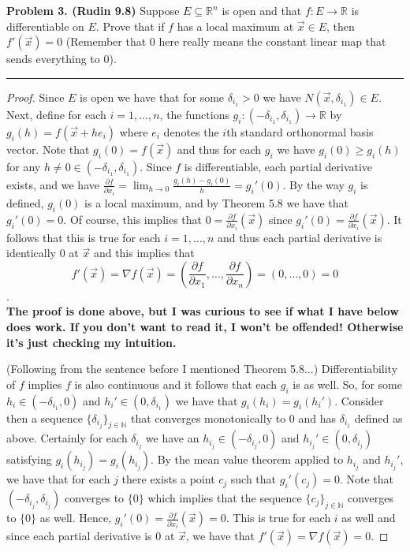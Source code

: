 \documentclass[leqno]{article}
\theoremstyle{nonumberplain}
\newtheorem{proof}{Proof}
\newcommand{\R}{\mathbb{R}}
\newcommand{\N}{\mathbb{N}}
\begin{document}


\noindent\textbf{Problem 3. (Rudin 9.8)} Suppose $E\subseteq \R^n$ is open and that $f\colon E\to \R$ is differentiable on $E$. Prove that if $f$ has a local maximum at $\vec{x}\in E$, then $f'(\vec{x})=0$ (Remember that $0$ here really means the constant linear map that sends everything to $0$).

\noindent\rule[0.5ex]{\linewidth}{1pt}

\begin{proof} 
Since $E$ is open we have that for some $\delta_{i_1}>0$ we have $N(\vec{x},\delta_{i_1})\in E$. Next, define for each $i=1,\dots, n$, the functions $g_i\colon (-\delta_{i_1},\delta_{i_1}) \to \R$ by $g_i(h)=f(\vec{x}+he_i)$ where $e_i$ denotes the $i$th standard orthonormal basis vector.  Note that $g_i(0)=f(\vec{x})$ and thus for each $g_i$ we have $g_i(0)\geq g_i(h)$ for any $h\neq 0 \in (-\delta_{i_1},\delta_{i_1})$.  Since $f$ is differentiable, each partial derivative exists, and we have $\frac{\partial f}{\partial x_i}=\lim_{h\to 0} \frac{g_i(h)-g_i(0)}{h}=g_i'(0)$. By the way $g_i$ is defined, $g_i(0)$ is a local maximum, and by Theorem 5.8 we have that $g_i'(0)=0$.  Of course, this implies that $0=\frac{\partial f}{\partial x_i}(\vec{x})$ since $g_i'(0)=\frac{\partial f}{\partial x_i}(\vec{x})$.  It follows that this is true for each $i=1,\dots, n$ and thus each partial derivative is identically 0 at $\vec{x}$ and this implies that \[f'(\vec{x})=\nabla f(\vec{x})=\left(\frac{\partial f}{\partial x_1},\dots,\frac{\partial f}{\partial x_n}\right)=(0,\dots,0)=0\].  \\

\noindent \textbf{The proof is done above, but I was curious to see if what I have below does work.  If you don't want to read it, I won't be offended! Otherwise it's just checking my intuition.}

(Following from the sentence before I mentioned Theorem 5.8...) Differentiability of $f$ implies $f$ is also continuous and it follows that each $g_i$ is as well. So, for some $h_{i} \in (-\delta_{i_1},0)$ and $h_{i}' \in (0,\delta_{i_1})$ we have that $g_i(h_{i})=g_i(h_{i}')$. Consider then a sequence $\{\delta_{i_j}\}_{j\in \N}$ that converges monotonically to $0$ and has $\delta_{i_1}$ defined as above.  Certainly for each $\delta_{i_j}$ we have an $h_{i_j}\in (-\delta_{i_j},0)$ and $h_{i_j}'\in (0,\delta_{i_j})$ satisfying $g_i(h_{i_j})=g_i(h_{i_j})$. By the mean value theorem applied to $h_{i_j}$ and $h_{i_j}'$, we have that for each $j$ there exists a point $c_j$ such that $g_i'(c_j)=0$. Note that $(-\delta_{i_j},\delta_{i_j})$ converges to $\{0\}$ which implies that the sequence $\{c_j\}_{j\in \N}$ converges to $\{0\}$ as well.  Hence, $g_i'(0)=\frac{\partial f}{\partial x_i}(\vec{x})=0$.  This is true for each $i$ as well and since each partial derivative is $0$ at $\vec{x}$, we have that $f'(\vec{x})=\nabla f(\vec{x})=0$.


\end{proof}
\end{document}
